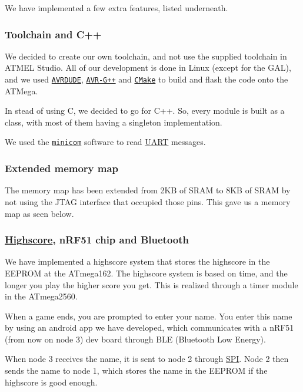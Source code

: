 We have implemented a few extra features, listed underneath.

\subsubsection*{Toolchain and C++}

We decided to create our own toolchain, and not use the supplied toolchain in A\+T\+M\+EL Studio. All of our development is done in Linux (except for the G\+AL), and we used \href{http://www.nongnu.org/avrdude/}{\tt A\+V\+R\+D\+U\+DE}, \href{http://www.nongnu.org/avr-libc/}{\tt A\+V\+R-\/\+G++} and \href{https://cmake.org/}{\tt C\+Make} to build and flash the code onto the A\+T\+Mega.

In stead of using C, we decided to go for C++. So, every module is built as a class, with most of them having a singleton implementation.

We used the \href{https://help.ubuntu.com/community/Minicom}{\tt minicom} software to read \hyperlink{class_u_a_r_t}{U\+A\+RT} messages.

\subsubsection*{Extended memory map}

The memory map has been extended from 2\+KB of S\+R\+AM to 8\+KB of S\+R\+AM by not using the J\+T\+AG interface that occupied those pins. This gave us a memory map as seen below.



\subsubsection*{\hyperlink{namespace_highscore}{Highscore}, n\+R\+F51 chip and Bluetooth}

We have implemented a highscore system that stores the highscore in the E\+E\+P\+R\+OM at the A\+Tmega162. The highscore system is based on time, and the longer you play the higher score you get. This is realized through a timer module in the A\+Tmega2560.

When a game ends, you are prompted to enter your name. You enter this name by using an android app we have developed, which communicates with a n\+R\+F51 (from now on node 3) dev board through B\+LE (Bluetooth Low Energy).

When node 3 receives the name, it is sent to node 2 through \hyperlink{namespace_s_p_i}{S\+PI}. Node 2 then sends the name to node 1, which stores the name in the E\+E\+P\+R\+OM if the highscore is good enough.

